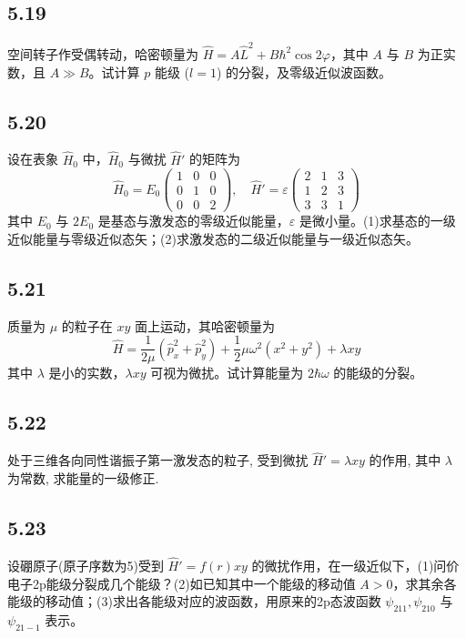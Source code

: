 \subsection{5.19}
空间转子作受偶转动，哈密顿量为 $\hat{H} = A\hat{L}^2 + B\hbar^2 \cos 2\varphi$，其中 $A$ 与 $B$ 为正实数，且 $A \gg B$。试计算 $p$ 能级 ($l=1$) 的分裂，及零级近似波函数。

\subsection{5.20}
设在表象 $\hat{H}_0$ 中，$\hat{H}_0$ 与微扰 $\hat{H}'$ 的矩阵为
$$\hat{H}_0 = E_0 \begin{pmatrix} 1 & 0 & 0 \\ 0 & 1 & 0 \\ 0 & 0 & 2 \end{pmatrix}, \quad \hat{H}' = \varepsilon \begin{pmatrix} 2 & 1 & 3 \\ 1 & 2 & 3 \\ 3 & 3 & 1 \end{pmatrix}$$
其中 $E_0$ 与 $2E_0$ 是基态与激发态的零级近似能量，$\varepsilon$ 是微小量。(1)求基态的一级近似能量与零级近似态矢；(2)求激发态的二级近似能量与一级近似态矢。

\subsection{5.21}
质量为 $\mu$ 的粒子在 $xy$ 面上运动，其哈密顿量为
$$\hat{H} = \frac{1}{2\mu} (\hat{p}_x^2 + \hat{p}_y^2) + \frac{1}{2}\mu\omega^2 (x^2 + y^2) + \lambda xy$$
其中 $\lambda$ 是小的实数，$\lambda xy$ 可视为微扰。试计算能量为 $2\hbar\omega$ 的能级的分裂。

\subsection{5.22}
处于三维各向同性谐振子第一激发态的粒子, 受到微扰 $\hat{H}' = \lambda xy$ 的作用, 其中 $\lambda$ 为常数, 求能量的一级修正.

\subsection{5.23}
设硼原子(原子序数为5)受到 $\hat{H}' = f(r)xy$ 的微扰作用，在一级近似下，(1)问价电子2p能级分裂成几个能级？(2)如已知其中一个能级的移动值 $A > 0$，求其余各能级的移动值；(3)求出各能级对应的波函数，用原来的2p态波函数 $\psi_{211}, \psi_{210}$ 与 $\psi_{21-1}$ 表示。

